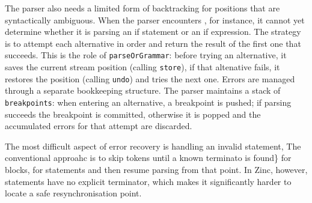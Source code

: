 The parser also needs a limited form of backtracking for positions that are syntactically ambiguous. When the parser encounters , for instance, it cannot yet determine whether it is parsing an if statement or an if expression. The strategy is to attempt each alternative in order and return the result of the first one that succeeds. This is the role of \texttt{parseOrGrammar}: before trying an alternative, it saves the current stream position (calling \texttt{store}), if that altenative fails, it restores the position (calling \texttt{undo}) and tries the next one.
Errors are managed through a separate bookkeeping structure. The parser maintains a stack of \texttt{breakpoints}: when entering an alternative, a breakpoint is pushed; if parsing succeeds the breakpoint is committed, otherwise it is popped and the accumulated errors for that attempt are discarded.

The most difficult aspect of error recovery is handling an invalid statement, The conventional approahc is to skip tokens until a known terminato is found\} for blocks, \zn{;} for statements and then resume parsing from that point. In Zinc, however, statements have no explicit terminator, which makes it significantly harder to locate a safe resynchronisation point.
